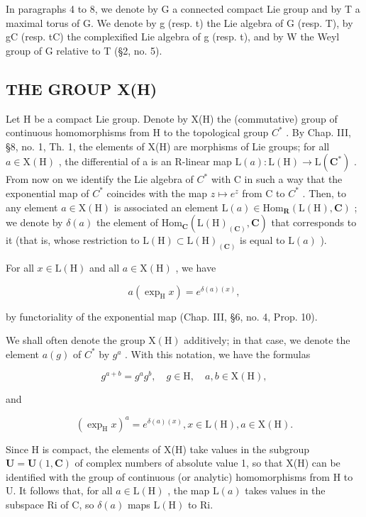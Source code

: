 In paragraphs 4 to 8, we denote by G a connected compact Lie group and by T a maximal torus of G. We denote by g (resp. t) the Lie algebra of G (resp. T), by gC (resp. tC) the complexified Lie algebra of g (resp. t), and by W the Weyl group of G relative to T (§2, no. 5).

\subsection{THE GROUP X(H)}

Let H be a compact Lie group. Denote by X(H) the (commutative) group of continuous homomorphisms from H to the topological group \(C^{*}\) . By Chap. III, §8, no. 1, Th. 1, the elements of X(H) are morphisms of Lie groups; for all \(a \in \mathrm{X}(\mathrm{H})\) , the differential of a is an R-linear map \(\mathrm{L}(a) : \mathrm{L}(\mathrm{H}) \to \mathrm{L}(\mathbf{C}^{*})\) . From now on we identify the Lie algebra of \(C^{*}\) with C in such a way that the exponential map of \(C^{*}\) coincides with the map \(z \mapsto e^{z}\) from C to \(C^{*}\) . Then, to any element \(a \in \mathrm{X}(\mathrm{H})\) is associated an element \(\mathrm{L}(a) \in \mathrm{Hom}_{\mathbf{R}}(\mathrm{L}(\mathrm{H}), \mathbf{C})\) ; we denote by \(\delta(a)\) the element of \(\mathrm{Hom}_{\mathbf{C}}(\mathrm{L}(\mathrm{H})_{(\mathbf{C})}, \mathbf{C})\) that corresponds to it (that is, whose restriction to \(\mathrm{L}(\mathrm{H}) \subset \mathrm{L}(\mathrm{H})_{(\mathbf{C})}\) is equal to \(\mathrm{L}(a)\) ).

For all \(x \in \mathrm{L}(\mathrm{H})\) and all \(a \in \mathrm{X}(\mathrm{H})\) , we have

\[
a (\exp_ {\mathrm{H}} x) = e ^ {\delta (a) (x)},
\]

by functoriality of the exponential map (Chap. III, §6, no. 4, Prop. 10).

We shall often denote the group \(\mathrm{X}(\mathrm{H})\) additively; in that case, we denote the element \(a(g)\) of \(C^{*}\) by \(g^{a}\) . With this notation, we have the formulas

\[
g ^ {a + b} = g ^ {a} g ^ {b}, \quad g \in \mathrm{H}, \quad a, b \in \mathrm{X(H)},
\]

and

\[
(\exp_ {\mathrm{H}} x) ^ {a} = e ^ {\delta (a) (x)}, x \in \mathrm{L} (\mathrm{H}), a \in \mathrm{X} (\mathrm{H}).
\]

Since H is compact, the elements of X(H) take values in the subgroup \(\mathbf{U} = \mathbf{U}(1, \mathbf{C})\) of complex numbers of absolute value 1, so that X(H) can be identified with the group of continuous (or analytic) homomorphisms from H to U. It follows that, for all \(a \in \mathrm{L}(\mathrm{H})\) , the map \(\mathrm{L}(a)\) takes values in the subspace Ri of C, so \(\delta(a)\) maps \(\mathrm{L}(\mathrm{H})\) to Ri.

